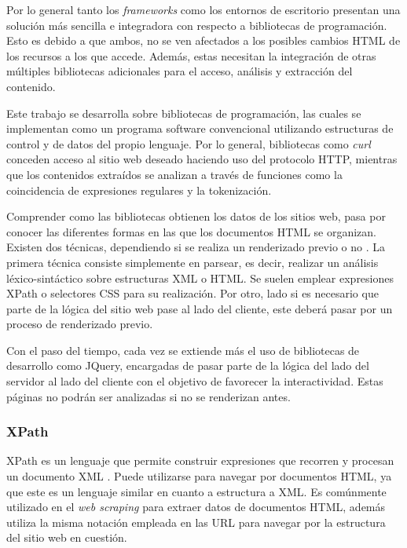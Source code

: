 Por lo general tanto los \emph{frameworks} como los entornos de escritorio presentan una solución más 
sencilla e integradora con respecto a bibliotecas de programación. Esto es debido a que ambos, no se ven 
afectados a los posibles cambios HTML de los recursos a los que accede. Además, estas necesitan la 
integración de otras múltiples bibliotecas adicionales para el acceso, análisis y extracción del contenido.

Este trabajo se desarrolla sobre bibliotecas de programación, las cuales se implementan como un programa
software convencional utilizando estructuras de control y de datos del propio lenguaje. Por lo general,
bibliotecas como \emph{curl \cite{curl-cran}} conceden acceso al sitio web deseado haciendo uso del
protocolo HTTP, mientras que los contenidos extraídos se analizan a través de funciones como la
coincidencia de expresiones regulares y la tokenización.

Comprender como las bibliotecas obtienen los datos de los sitios web, pasa por conocer las diferentes
formas en las que los documentos HTML se organizan. Existen dos técnicas, dependiendo si se realiza un
renderizado previo o no \cite{tfg-daniel-francisco-lopez}. La primera técnica consiste simplemente en
parsear, es decir, realizar un análisis léxico-sintáctico sobre estructuras XML o HTML. Se suelen emplear
expresiones XPath o selectores CSS para su realización. Por otro, lado si es necesario que parte de la 
lógica del sitio web pase al lado del cliente, este deberá pasar por un proceso de renderizado previo.

Con el paso del tiempo, cada vez se extiende más el uso de bibliotecas de desarrollo como JQuery, encargadas 
de pasar parte de la lógica del lado del servidor al lado del cliente con el objetivo de favorecer la 
interactividad. Estas páginas no podrán ser analizadas si no se renderizan antes.

\subsubsection{XPath}
\label{subsubsec:xpath}

XPath es un lenguaje que permite construir expresiones que recorren y procesan un documento XML
\cite{css-xpath-lilland}. Puede utilizarse para navegar por documentos HTML, ya que este es un lenguaje
similar en cuanto a estructura a XML. Es comúnmente utilizado en el \emph{web scraping} para extraer datos 
de documentos HTML, además utiliza la misma notación empleada en las URL para navegar por la estructura 
del sitio web en cuestión.

